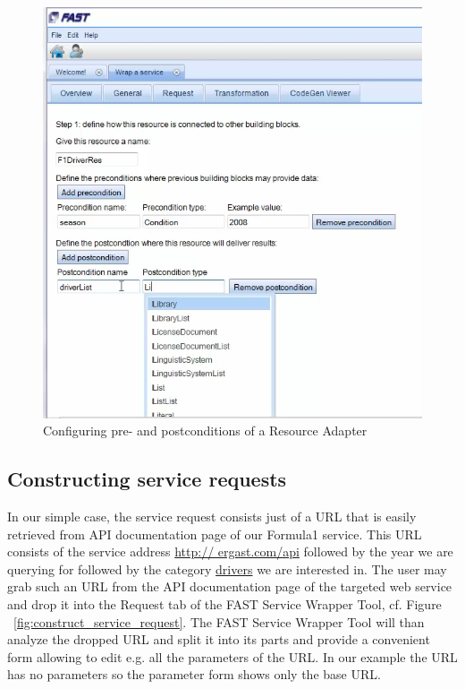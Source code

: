 \documentclass{article}
\begin{document}
\begin{figure}
  \begin{center} \includegraphics[width=\linewidth]{images/ServiceWrapperToolGVSWithPrePostConds.png}
    \caption{Configuring pre- and postconditions of a Resource Adapter}
    \label{fig:construct_pre_post_conditions}
  \end{center}
\end{figure}


\subsection{Constructing service requests} %
\label{sub:constructing_service_requests}

In our simple case, the service request consists just of a URL that is easily retrieved from API documentation page of our Formula1 service. This URL consists of the service address \url{http:// ergast.com/api} followed by the year we are querying for followed by the category \url{drivers} we are interested in. The user may grab such an URL from the API documentation page of the targeted web service and drop it into the Request tab of the FAST Service Wrapper Tool, cf. Figure ~\ref{fig:construct_service_request}.  The FAST Service Wrapper Tool will than analyze the dropped URL and split it into its parts and provide a convenient form allowing to edit e.g. all the parameters of the URL. In our example the URL has no parameters so the parameter form shows only the base URL. 
\end{document}
